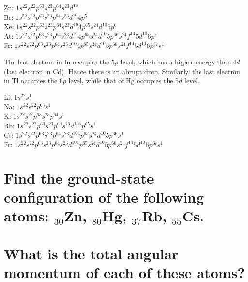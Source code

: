 \documentclass[answers]{exam}
\begin{document}
\begin{questions}

\begin{solution}
	Zn: $1s^22s^22p^63s^23p^64s^23d^{10}$ \\
	Br: $1s^22s^22p^63s^23p^64s^23d^{10}4p^5$ \\
	Xe: $1s^22s^22p^63s^23p^64s^23d^{10}4p^65s^24d^{10}5p^6$ \\
	At: $1s^22s^22p^63s^23p^64s^23d^{10}4p^65s^24d^{10}5p^66s^24f^{14}5d^{10}6p^5$ \\
	Fr: $1s^22s^22p^63s^23p^64s^23d^{10}4p^65s^24d^{10}5p^66s^24f^{14}5d^{10}6p^67s^1$
\end{solution}


\begin{solution}
	The last electron in In occupies the 5$p$ level, which has a higher energy than 4$d$ (last electron in Cd). Hence there is an abrupt drop. Similarly, the last electron in Tl occupies the 6$p$ level, while that of Hg occupies the 5$d$ level.
\end{solution}


\begin{solution}
	Li: $1s^22s^1$ \\
	Na: $1s^22s^22p^63s^1$ \\
	K: $1s^22s^22p^63s^23p^64s^1$ \\
	Rb: $1s^22s^22p^63s^23p^64s^23d^104p^65s^1$ \\
	Cs: $1s^22s^22p^63s^23p^64s^23d^104p^65s^24d^{10}5p^66s^1$ \\
	Fr: $1s^22s^22p^63s^23p^64s^23d^104p^65s^24d^{10}5p^66s^24f^{14}5d^{10}6p^67s^1$
\end{solution}

\question{}

\begin{parts}
	\part{Find the ground-state configuration of the following atoms: $_{30}$Zn, $_{80}$Hg, $_{37}$Rb, $_{55}$Cs.}
	\part{What is the total angular momentum of each of these atoms?}
\end{parts}


\end{questions}
\end{document}
